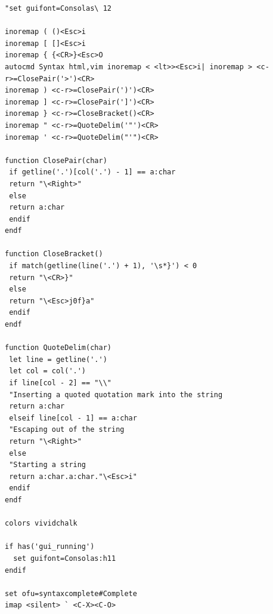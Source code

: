 \documentclass[twocolumn]{article}
\begin{document}
\begin{twocolumn}
\begin{lstlisting}
"set guifont=Consolas\ 12

inoremap ( ()<Esc>i
inoremap [ []<Esc>i
inoremap { {<CR>}<Esc>O
autocmd Syntax html,vim inoremap < <lt>><Esc>i| inoremap > <c-r>=ClosePair('>')<CR>
inoremap ) <c-r>=ClosePair(')')<CR>
inoremap ] <c-r>=ClosePair(']')<CR>
inoremap } <c-r>=CloseBracket()<CR>
inoremap " <c-r>=QuoteDelim('"')<CR>
inoremap ' <c-r>=QuoteDelim("'")<CR>

function ClosePair(char)
 if getline('.')[col('.') - 1] == a:char
 return "\<Right>"
 else
 return a:char
 endif
endf

function CloseBracket()
 if match(getline(line('.') + 1), '\s*}') < 0
 return "\<CR>}"
 else
 return "\<Esc>j0f}a"
 endif
endf

function QuoteDelim(char)
 let line = getline('.')
 let col = col('.')
 if line[col - 2] == "\\"
 "Inserting a quoted quotation mark into the string
 return a:char
 elseif line[col - 1] == a:char
 "Escaping out of the string
 return "\<Right>"
 else
 "Starting a string
 return a:char.a:char."\<Esc>i"
 endif
endf

colors vividchalk

if has('gui_running')
  set guifont=Consolas:h11
endif

set ofu=syntaxcomplete#Complete
imap <silent> ` <C-X><C-O>
\end{lstlisting}

\begin{lstlisting}
\end{lstlisting}
\end{twocolumn}
\end{document}
